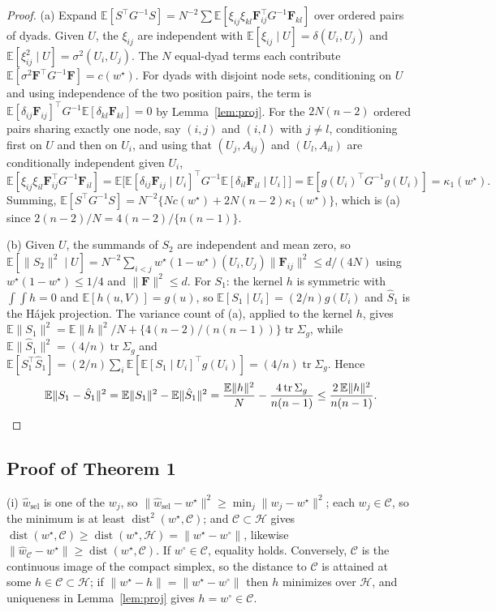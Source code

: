 \documentclass[12pt]{article}
\newcommand{\E}{\mathbb{E}}
\newcommand{\calH}{\mathcal{H}}
\newcommand{\calC}{\mathcal{C}}
\newcommand{\dist}{\operatorname{dist}}
\newcommand{\tr}{\operatorname{tr}}
\newcommand{\norm}[1]{\|#1\|}
\newcommand{\wstar}{w^{\star}}
\newcommand{\wproj}{w^{\circ}}
\newcommand{\what}{\hat w}
\newcommand{\Fv}{\mathbf{F}}
\begin{document}
\begin{proof}
(a) Expand $\E[S^{\top}G^{-1}S]=N^{-2}\sum\E[\xi_{ij}\xi_{kl}\Fv_{ij}^{\top}G^{-1}\Fv_{kl}]$ over ordered pairs of dyads. Given $U$, the $\xi_{ij}$ are independent with $\E[\xi_{ij}\mid U]=\delta(U_i,U_j)$ and $\E[\xi_{ij}^2\mid U]=\sigma^2(U_i,U_j)$. The $N$ equal-dyad terms each contribute $\E[\sigma^2\Fv^{\top}G^{-1}\Fv]=c(\wstar)$. For dyads with disjoint node sets, conditioning on $U$ and using independence of the two position pairs, the term is $\E[\delta_{ij}\Fv_{ij}]^{\top}G^{-1}\E[\delta_{kl}\Fv_{kl}]=0$ by Lemma~\ref{lem:proj}. For the $2N(n-2)$ ordered pairs sharing exactly one node, say $(i,j)$ and $(i,l)$ with $j\neq l$, conditioning first on $U$ and then on $U_i$, and using that $(U_j,A_{ij})$ and $(U_l,A_{il})$ are conditionally independent given $U_i$,
\[
\E[\xi_{ij}\xi_{il}\Fv_{ij}^{\top}G^{-1}\Fv_{il}]=\E\big[\E[\delta_{ij}\Fv_{ij}\mid U_i]^{\top}G^{-1}\E[\delta_{il}\Fv_{il}\mid U_i]\big]=\E[g(U_i)^{\top}G^{-1}g(U_i)]=\kappa_1(\wstar).
\]
Summing, $\E[S^{\top}G^{-1}S]=N^{-2}\{Nc(\wstar)+2N(n-2)\kappa_1(\wstar)\}$, which is (a) since $2(n-2)/N=4(n-2)/\{n(n-1)\}$.

(b) Given $U$, the summands of $S_2$ are independent and mean zero, so $\E[\norm{S_2}^2\mid U]=N^{-2}\sum_{i<j}\wstar(1-\wstar)(U_i,U_j)\norm{\Fv_{ij}}^2\le d/(4N)$ using $\wstar(1-\wstar)\le1/4$ and $\norm{\Fv}^2\le d$. For $S_1$: the kernel $h$ is symmetric with $\int\!\!\int h=0$ and $\E[h(u,V)]=g(u)$, so $\E[S_1\mid U_i]=(2/n)g(U_i)$ and $\hat S_1$ is the H\'ajek projection. The variance count of (a), applied to the kernel $h$, gives $\E\norm{S_1}^2=\E\norm{h}^2/N+\{4(n-2)/(n(n-1))\}\tr\Sigma_g$, while $\E\norm{\hat S_1}^2=(4/n)\tr\Sigma_g$ and $\E[S_1^{\top}\hat S_1]=(2/n)\sum_i\E[\E[S_1\mid U_i]^{\top}g(U_i)]=(4/n)\tr\Sigma_g$. Hence
\[
\E\norm{S_1-\hat S_1}^2=\E\norm{S_1}^2-\E\norm{\hat S_1}^2=\frac{\E\norm{h}^2}{N}-\frac{4\tr\Sigma_g}{n(n-1)}\le\frac{2\,\E\norm{h}^2}{n(n-1)}. \qedhere
\]
\end{proof}

\subsection*{Proof of Theorem 1}

(i) $\what_{\mathrm{sel}}$ is one of the $w_j$, so $\norm{\what_{\mathrm{sel}}-\wstar}^2\ge\min_j\norm{w_j-\wstar}^2$; each $w_j\in\calC$, so the minimum is at least $\dist^2(\wstar,\calC)$; and $\calC\subset\calH$ gives $\dist(\wstar,\calC)\ge\dist(\wstar,\calH)=\norm{\wstar-\wproj}$, likewise $\norm{\what_{\calC}-\wstar}\ge\dist(\wstar,\calC)$. If $\wproj\in\calC$, equality holds. Conversely, $\calC$ is the continuous image of the compact simplex, so the distance to $\calC$ is attained at some $h\in\calC\subset\calH$; if $\norm{\wstar-h}=\norm{\wstar-\wproj}$ then $h$ minimizes over $\calH$, and uniqueness in Lemma~\ref{lem:proj} gives $h=\wproj\in\calC$.
\end{document}
